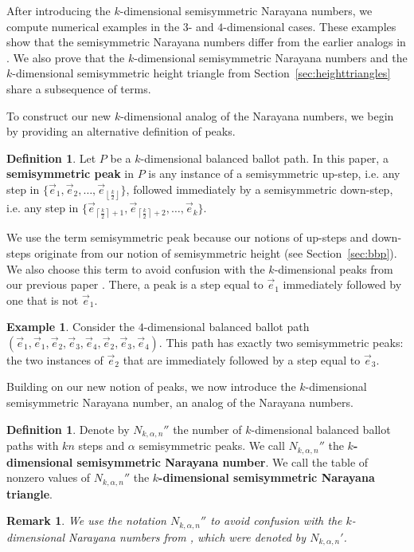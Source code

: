 \documentclass[11pt]{article}
\newtheorem{remark}[theorem]{Remark}
\theoremstyle{remark}
\theoremstyle{definition}
\newtheorem{definition}[theorem]{Definition}
\newtheorem{example}[theorem]{Example}
\begin{document}
After introducing the $k$-dimensional semisymmetric Narayana numbers, we compute numerical examples in the $3$- and $4$-dimensional cases. These examples show that the semisymmetric Narayana numbers differ from the earlier analogs in \cite{multidimnarayana, MR5034574}. We also prove that the $k$-dimensional semisymmetric Narayana numbers and the $k$-dimensional semisymmetric height triangle from Section~\ref{sec:heighttriangles} share a subsequence of terms.

To construct our new $k$-dimensional analog of the Narayana numbers, we begin by providing an alternative definition of peaks.
\begin{definition}
Let $P$ be a $k$-dimensional balanced ballot path. In this paper, a \textbf{semisymmetric peak} in $P$ is any instance of a semisymmetric up-step, i.e. any step in $\{\vec{e}_1, \vec{e}_2, \dots, \vec{e}_{\left\lfloor \frac{k}{2} \right\rfloor}\}$, followed immediately by a semisymmetric down-step, i.e. any step in $\{\vec{e}_{\left\lceil \frac{k
}{2} \right\rceil+1}, \vec{e}_{\left\lceil \frac{k
}{2} \right\rceil+2}, \dots, \vec{e}_{k}\}$.
\end{definition}

We use the term semisymmetric peak because our notions of up-steps and down-steps originate from our notion of semisymmetric height (see Section~\ref{sec:bbp}). We also choose this term to avoid confusion with the $k$-dimensional peaks from our previous paper \cite{MR5034574}. There, a peak is a step equal to $\vec{e}_1$ immediately followed by one that is not $\vec{e}_1$.

\begin{example}
Consider the $4$-dimensional balanced ballot path $(\vec{e}_1, \vec{e}_1, \vec{e}_2, \vec{e}_3, \vec{e}_4, \vec{e}_2, \vec{e}_3, \vec{e}_4)$. This path has exactly two semisymmetric peaks: the two instances of $\vec{e}_2$ that are immediately followed by a step equal to $\vec{e}_3$.
\end{example}

Building on our new notion of peaks, we now introduce the $k$-dimensional semisymmetric Narayana number, an analog of the Narayana numbers.

\begin{definition}
Denote by $N_{k,\alpha,n}''$ the number of $k$-dimensional balanced ballot paths with $kn$ steps and $\alpha$ semisymmetric peaks. We call $N_{k, \alpha, n}''$ the \textbf{$k$-dimensional semisymmetric Narayana number}. We call the table of nonzero values of $N_{k, \alpha, n}''$ the \textbf{$k$-dimensional semisymmetric Narayana triangle}.
\end{definition}
\begin{remark}
We use the notation $N_{k, \alpha, n}''$ to avoid confusion with the $k$-dimensional Narayana numbers from \cite{MR5034574}, which were denoted by $N_{k, \alpha ,n}'$.\end{remark}
\end{document}
